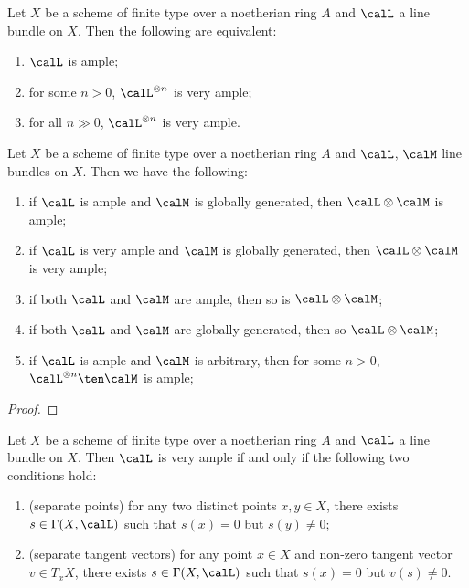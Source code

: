     \begin{theorem}\label{thm:ample_very_ample}
        Let \(X\) be a scheme of finite type over a noetherian ring \(A\) and \(\calL\) a line bundle on \(X\).
        Then the following are equivalent:
        \begin{enumerate}
            \item \(\calL\) is ample;
            \item for some \(n>0\), \(\calL^{\otimes n}\) is very ample;
            \item for all \(n \gg 0\), \(\calL^{\otimes n}\) is very ample.
        \end{enumerate}
    \end{theorem}

    \begin{proposition}\label{prop:tensor_with_ample_very_ample_and_bpf}
        Let \(X\) be a scheme of finite type over a noetherian ring \(A\) and \(\calL\), \(\calM\) line bundles on \(X\).
        Then we have the following:
        \begin{enumerate}
            \item if \(\calL\) is ample and \(\calM\) is globally generated, then \(\calL \otimes \calM\) is ample;
            \item if \(\calL\) is very ample and \(\calM\) is globally generated, then \(\calL \otimes \calM\) is very ample;
            \item if both \(\calL\) and \(\calM\) are ample, then so is \(\calL \otimes \calM\);
            \item if both \(\calL\) and \(\calM\) are globally generated, then so \(\calL \otimes \calM\);
            \item if \(\calL\) is ample and \(\calM\) is arbitrary, then for some \(n>0\), \(\calL^{\otimes n} \ten \calM\) is ample;
        \end{enumerate}
    \end{proposition}
    \begin{proof}
    \end{proof}

    \begin{proposition}\label{prop:very_ample_iff_separates_points_and_vectors}
        Let \(X\) be a scheme of finite type over a noetherian ring \(A\) and \(\calL\) a line bundle on \(X\).
        Then \(\calL\) is very ample if and only if the following two conditions hold:
        \begin{enumerate}
            \item (separate points) for any two distinct points \(x,y\in X\), there exists \(s\in \Gamma(X,\calL)\) such that \(s(x)=0\) but \(s(y)\neq 0\);
            \item (separate tangent vectors) for any point \(x\in X\) and non-zero tangent vector \(v\in T_xX\), there exists \(s\in \Gamma(X,\calL)\) such that \(s(x)=0\) but \(v(s)\neq 0\).
        \end{enumerate}
        
    \end{proposition}


